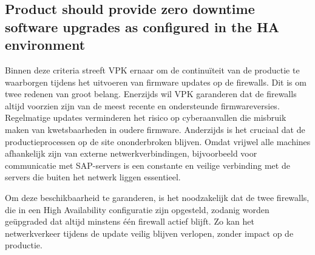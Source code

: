 \subsection{Product should provide zero downtime software upgrades as configured in the HA environment}
Binnen deze criteria streeft VPK ernaar om de continuïteit van de productie te waarborgen tijdens het uitvoeren van firmware updates op de firewalls. Dit is om twee redenen van groot belang.
Enerzijds wil VPK garanderen dat de firewalls altijd voorzien zijn van de meest recente en ondersteunde firmwareversies. Regelmatige updates verminderen het risico op cyberaanvallen die misbruik maken van kwetsbaarheden in oudere firmware.
Anderzijds is het cruciaal dat de productieprocessen op de site ononderbroken blijven. Omdat vrijwel alle machines afhankelijk zijn van externe netwerkverbindingen, bijvoorbeeld voor communicatie met SAP-servers is een constante en veilige verbinding met de servers die buiten het netwerk liggen essentieel.

Om deze beschikbaarheid te garanderen, is het noodzakelijk dat de twee firewalls, die in een High Availability configuratie zijn opgesteld, zodanig worden geüpgraded dat altijd minstens één firewall actief blijft. Zo kan het netwerkverkeer tijdens de update veilig blijven verlopen, zonder impact op de productie.

